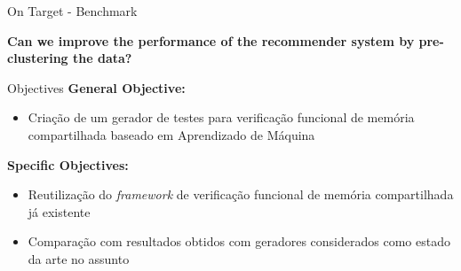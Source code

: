 
\begin{frame}{On Target - Benchmark}

\end{frame}


\begin{frame}{}
    \begin{center}
        \huge{\textbf{Can we improve the performance of the recommender system by pre-clustering the data?}}
    \end{center}
\end{frame}


\begin{frame}{Objectives}
\textbf{General Objective:\\}
\begin{itemize}
    \item Criação de um gerador de testes para verificação funcional de memória compartilhada baseado em Aprendizado de Máquina
\end{itemize}
\vspace{0.5cm}
\textbf{Specific Objectives:\\}
\begin{itemize}
    \item Reutilização do \textit{framework} de verificação funcional de memória compartilhada já existente
    \item Comparação com resultados obtidos com geradores considerados como estado da arte no assunto
\end{itemize}
\end{frame}